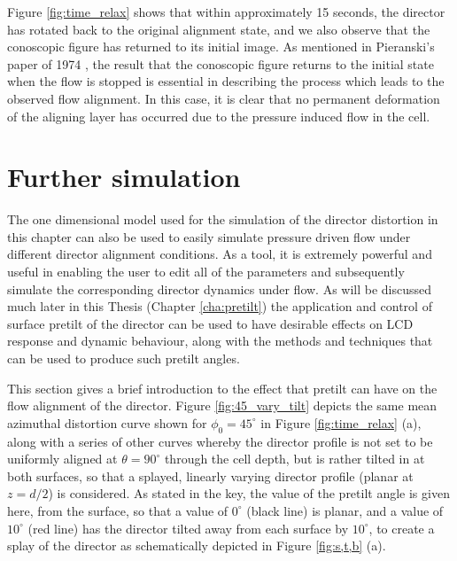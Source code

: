 Figure \ref{fig:time_relax} shows that within approximately 15 seconds, the director has rotated back to the original alignment state, and we also observe that the conoscopic figure has returned to its initial image. As mentioned in Pieranski's paper of 1974 \cite{Pieranski1974}, the result that the conoscopic figure returns to the initial state when the flow is stopped is essential in describing the process which leads to the observed flow alignment. In this case, it is clear that no permanent deformation of the aligning layer has occurred due to the pressure induced flow in the cell.

\section{Further simulation}
\label{sec:45_vary_tilt}
The one dimensional model used for the simulation of the director distortion in this chapter can also be used to easily simulate pressure driven flow under different director alignment conditions. As a tool, it is extremely powerful and useful in enabling the user to edit all of the parameters and subsequently simulate the corresponding director dynamics under flow. As will be discussed much later in this Thesis (Chapter \ref{cha:pretilt}) the application and control of surface pretilt of the director can be used to have desirable effects on LCD response and dynamic behaviour, along with the methods and techniques that can be used to produce such pretilt angles. 

This section gives a brief introduction to the effect that pretilt can have on the flow alignment of the director. Figure \ref{fig:45_vary_tilt} depicts the same mean azimuthal distortion curve shown for $\phi_0=45^{\circ}$ in Figure \ref{fig:time_relax} (a), along with a series of other curves whereby the director profile is not set to be uniformly aligned at $\theta=90^{\circ}$ through the cell depth, but is rather tilted in at both surfaces, so that a splayed, linearly varying director profile (planar at $z=d/2$) is considered. As stated in the key, the value of the pretilt angle is given here, from the surface, so that a value of $0^{\circ}$ (black line) is planar, and a value of $10^{\circ}$ (red line) has the director tilted away from each surface by $10^{\circ}$, to create a splay of the director as schematically depicted in Figure \ref{fig:s,t,b} (a).

